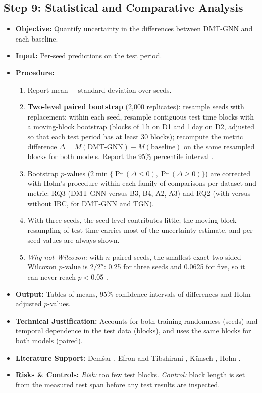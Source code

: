 \documentclass[11pt,a4paper]{article}
\begin{document}
\subsection{Step 9: Statistical and Comparative Analysis}
\begin{itemize}[leftmargin=*]
    \item \textbf{Objective:} Quantify uncertainty in the differences between DMT-GNN and each baseline.
    \item \textbf{Input:} Per-seed predictions on the test period.
    \item \textbf{Procedure:}
    \begin{enumerate}[leftmargin=*]
        \item Report mean $\pm$ standard deviation over seeds.
        \item \textbf{Two-level paired bootstrap} (2,000 replicates): resample seeds with replacement; within each seed, resample contiguous test time blocks with a moving-block bootstrap \cite{kunsch1989bootstrap} (blocks of 1\,h on D1 and 1\,day on D2, adjusted so that each test period has at least 30 blocks); recompute the metric difference $\Delta = M(\text{DMT-GNN}) - M(\text{baseline})$ on the same resampled blocks for both models. Report the 95\% percentile interval \cite{efron1993bootstrap}.
        \item Bootstrap $p$-values ($2\min\{\Pr(\Delta\le 0), \Pr(\Delta\ge 0)\}$) are corrected with Holm's procedure \cite{holm1979simple} within each family of comparisons per dataset and metric: RQ3 (DMT-GNN versus B3, B4, A2, A3) and RQ2 (with versus without IBC, for DMT-GNN and TGN).
        \item With three seeds, the seed level contributes little; the moving-block resampling of test time carries most of the uncertainty estimate, and per-seed values are always shown.
        \item \textit{Why not Wilcoxon:} with $n$ paired seeds, the smallest exact two-sided Wilcoxon $p$-value is $2/2^n$: 0.25 for three seeds and 0.0625 for five, so it can never reach $p<0.05$ \cite{demsar2006statistical}.
    \end{enumerate}
    \item \textbf{Output:} Tables of means, 95\% confidence intervals of differences and Holm-adjusted $p$-values.
    \item \textbf{Technical Justification:} Accounts for both training randomness (seeds) and temporal dependence in the test data (blocks), and uses the same blocks for both models (paired).
    \item \textbf{Literature Support:} Dem\v{s}ar \cite{demsar2006statistical}, Efron and Tibshirani \cite{efron1993bootstrap}, K\"unsch \cite{kunsch1989bootstrap}, Holm \cite{holm1979simple}.
    \item \textbf{Risks \& Controls:} \textit{Risk:} too few test blocks. \textit{Control:} block length is set from the measured test span before any test results are inspected.
\end{itemize}
\end{document}
